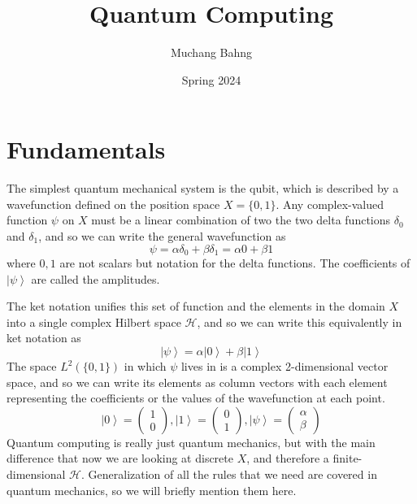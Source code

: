 \documentclass{article}
\newcommand{\ket}[1]{\ensuremath{\left|#1\right\rangle}}
\begin{document}
\title{Quantum Computing}
\author{Muchang Bahng}
\date{Spring 2024}

\maketitle
\tableofcontents
\pagebreak 

\section{Fundamentals}

  \begin{definition}[Qubit]
    The simplest quantum mechanical system is the qubit, which is described by a wavefunction defined on the position space $X = \{0, 1\}$. Any complex-valued function $\psi$ on $X$ must be a linear combination of two the two delta functions $\delta_0$ and $\delta_1$, and so we can write the general wavefunction as \begin{equation} 
      \psi = \alpha \delta_0 + \beta \delta_1 = \alpha 0 + \beta 1
    \end{equation} 
    where $0, 1$ are not scalars but notation for the delta functions. The coefficients of $\ket{\psi}$ are called the amplitudes. 
  \end{definition}

  The ket notation unifies this set of function and the elements in the domain $X$ into a single complex Hilbert space $\mathcal{H}$, and so we can write this equivalently in ket notation as 
  \begin{equation} 
    \ket{\psi} = \alpha \ket{0} + \beta \ket{1} 
  \end{equation}
  The space $L^2(\{0, 1\})$ in which $\psi$ lives in is a complex 2-dimensional vector space, and so we can write its elements as column vectors with each element representing the coefficients or the values of the wavefunction at each point. 
  \begin{equation} 
    \ket{0} = \begin{pmatrix} 1 \\ 0 \end{pmatrix}, \ket{1} = \begin{pmatrix} 0 \\ 1 \end{pmatrix}, \ket{\psi} = \begin{pmatrix} \alpha \\ \beta \end{pmatrix}
  \end{equation}
  Quantum computing is really just quantum mechanics, but with the main difference that now we are looking at discrete $X$, and therefore a finite-dimensional $\mathcal{H}$. Generalization of all the rules that we need are covered in quantum mechanics, so we will briefly mention them here. 
\end{document}
